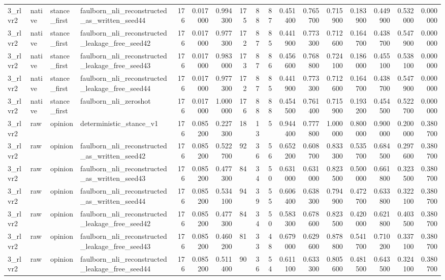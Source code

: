 \begin{tabular}{llllrrrrrrrrrrrrr}
3_rlvr2 & native & stance_first & faulborn_nli_reconstructed_as_written_seed44 & 176 & 0.017000 & 0.994300 & 175 & 88 & 87 & 0.451400 & 0.765700 & 0.715900 & 0.183900 & 0.449900 & 0.532000 & 0.000000 \\
3_rlvr2 & native & stance_first & faulborn_nli_reconstructed_leakage_free_seed42 & 176 & 0.017000 & 0.977300 & 172 & 87 & 85 & 0.441900 & 0.773300 & 0.712600 & 0.164700 & 0.438700 & 0.547900 & 0.000000 \\
3_rlvr2 & native & stance_first & faulborn_nli_reconstructed_leakage_free_seed43 & 176 & 0.017000 & 0.983000 & 173 & 87 & 86 & 0.456600 & 0.768800 & 0.724100 & 0.186000 & 0.455100 & 0.538100 & 0.000000 \\
3_rlvr2 & native & stance_first & faulborn_nli_reconstructed_leakage_free_seed44 & 176 & 0.017000 & 0.977300 & 172 & 87 & 85 & 0.441900 & 0.773300 & 0.712600 & 0.164700 & 0.438700 & 0.547900 & 0.000000 \\
3_rlvr2 & native & stance_first & faulborn_nli_zeroshot & 176 & 0.017000 & 1.000000 & 176 & 88 & 88 & 0.454500 & 0.761400 & 0.715900 & 0.193200 & 0.454500 & 0.522700 & 0.000000 \\
3_rlvr2 & raw & opinion & deterministic_stance_v1 & 176 & 0.085200 & 0.227300 & 18 & 13 & 5 & 0.944400 & 0.777800 & 1.000000 & 0.800000 & 0.900000 & 0.200000 & 0.380700 \\
3_rlvr2 & raw & opinion & faulborn_nli_reconstructed_as_written_seed42 & 176 & 0.085200 & 0.522700 & 92 & 36 & 56 & 0.652200 & 0.608700 & 0.833300 & 0.535700 & 0.684500 & 0.297600 & 0.380700 \\
3_rlvr2 & raw & opinion & faulborn_nli_reconstructed_as_written_seed43 & 176 & 0.085200 & 0.477300 & 84 & 34 & 50 & 0.631000 & 0.631000 & 0.823500 & 0.500000 & 0.661800 & 0.323500 & 0.380700 \\
3_rlvr2 & raw & opinion & faulborn_nli_reconstructed_as_written_seed44 & 176 & 0.085200 & 0.534100 & 94 & 39 & 55 & 0.606400 & 0.638300 & 0.794900 & 0.472700 & 0.633800 & 0.322100 & 0.380700 \\
3_rlvr2 & raw & opinion & faulborn_nli_reconstructed_leakage_free_seed42 & 176 & 0.085200 & 0.477300 & 84 & 34 & 50 & 0.583300 & 0.678600 & 0.823500 & 0.420000 & 0.621800 & 0.403500 & 0.380700 \\
3_rlvr2 & raw & opinion & faulborn_nli_reconstructed_leakage_free_seed43 & 176 & 0.085200 & 0.460200 & 81 & 33 & 48 & 0.679000 & 0.629600 & 0.878800 & 0.541700 & 0.710200 & 0.337100 & 0.380700 \\
3_rlvr2 & raw & opinion & faulborn_nli_reconstructed_leakage_free_seed44 & 176 & 0.085200 & 0.511400 & 90 & 36 & 54 & 0.611100 & 0.633300 & 0.805600 & 0.481500 & 0.643500 & 0.324100 & 0.380700 \\

\end{tabular}
